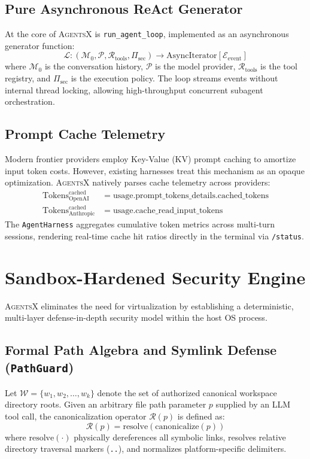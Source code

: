 \documentclass[10pt,twocolumn,letterpaper]{article}
\begin{document}
\subsection{Pure Asynchronous ReAct Generator}
At the core of \textsc{AgentsX} is \texttt{run\_agent\_loop}, implemented as an asynchronous generator function:
\begin{equation}
\mathcal{L}: (\mathcal{M}_0, \mathcal{P}, \mathcal{R}_{\text{tools}}, \Pi_{\text{sec}}) \longrightarrow \text{AsyncIterator}[\mathcal{E}_{\text{event}}]
\end{equation}
where $\mathcal{M}_0$ is the conversation history, $\mathcal{P}$ is the model provider, $\mathcal{R}_{\text{tools}}$ is the tool registry, and $\Pi_{\text{sec}}$ is the execution policy. The loop streams events without internal thread locking, allowing high-throughput concurrent subagent orchestration.

\subsection{Prompt Cache Telemetry}
Modern frontier providers employ Key-Value (KV) prompt caching to amortize input token costs. However, existing harnesses treat this mechanism as an opaque optimization. \textsc{AgentsX} natively parses cache telemetry across providers:
\begin{align}
\text{Tokens}_{\text{OpenAI}}^{\text{cached}} &= \text{usage}.\text{prompt\_tokens\_details}.\text{cached\_tokens} \\
\text{Tokens}_{\text{Anthropic}}^{\text{cached}} &= \text{usage}.\text{cache\_read\_input\_tokens}
\end{align}
The \texttt{AgentHarness} aggregates cumulative token metrics across multi-turn sessions, rendering real-time cache hit ratios directly in the terminal via \texttt{/status}.

\section{Sandbox-Hardened Security Engine}
\label{sec:security}

\textsc{AgentsX} eliminates the need for virtualization by establishing a deterministic, multi-layer defense-in-depth security model within the host OS process.

\subsection{Formal Path Algebra and Symlink Defense (\texttt{PathGuard})}
Let $\mathcal{W} = \{w_1, w_2, \dots, w_k\}$ denote the set of authorized canonical workspace directory roots. Given an arbitrary file path parameter $p$ supplied by an LLM tool call, the canonicalization operator $\mathcal{R}(p)$ is defined as:
\begin{equation}
\mathcal{R}(p) = \text{resolve}(\text{canonicalize}(p))
\end{equation}
where $\text{resolve}(\cdot)$ physically dereferences all symbolic links, resolves relative directory traversal markers (\texttt{..}), and normalizes platform-specific delimiters.
\end{document}
